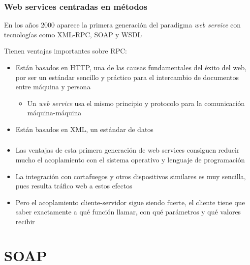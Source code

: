 \documentclass[ucs]{beamer}
\begin{document}
\begin{frame}[fragile]
\frametitle{Web services centradas en métodos}

En los años 2000 aparece la primera generación del paradigma \emph{web service}
con tecnologías como XML-RPC, SOAP y WSDL

Tienen ventajas importantes sobre RPC:
\begin{itemize}
\item
Están basados en HTTP, una de las causas fundamentales del éxito del web,
por ser un estándar sencillo y práctico para el intercambio de documentos
entre máquina y persona

\begin{itemize}
\item
Un \emph{web service} usa el mismo principio y protocolo para la comunicación
máquina-máquina
\end{itemize}

\item
Están basados en XML, un estándar de datos

\end{itemize}

\end{frame}

\begin{frame}[fragile]
\frametitle{}
\begin{itemize}
\item
Las ventajas de esta primera generación de web services
consiguen reducir mucho el acoplamiento con el sistema operativo y lenguaje
de programación
\item
La integración con cortafuegos y otros dispositivos similares es muy
sencilla, pues resulta tráfico web a estos efectos
\item
Pero el acoplamiento cliente-servidor sigue siendo fuerte, el cliente tiene que saber
exactamente a qué función llamar, con qué parámetros y qué valores recibir
\end{itemize}

\end{frame}

\section{SOAP}
\end{document}

